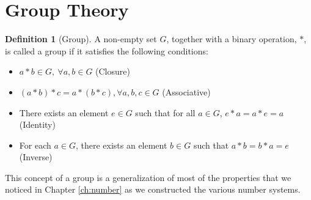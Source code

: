 \documentclass[
]{book}
\theoremstyle{definition}
\newtheorem{definition}{Definition}[chapter]
\theoremstyle{definition}
\theoremstyle{definition}
\theoremstyle{remark}
\begin{document}
\hypertarget{sec:groups}{%
\section{Group Theory}\label{sec:groups}}

\begin{definition}[Group]
\protect\hypertarget{def:unnamed-chunk-151}{}{\label{def:unnamed-chunk-151} {} }A non-empty set \(G\), together with a binary operation, \(*\), is called a group if it satisfies the following conditions:

\begin{itemize}
\item
  \(a*b \in G, \: \forall a,b \in G\) (Closure)
\item
  \((a*b)*c = a * (b*c), \forall a,b,c \in G\) (Associative)
\item
  There exists an element \(e \in G\) such that for all \(a\in G\), \(e*a=a*e=a\) (Identity)
\item
  For each \(a\in G\), there exists an element \(b\in G\) such that \(a*b=b*a=e\) (Inverse)
\end{itemize}
\end{definition}

This concept of a group is a generalization of most of the properties that we noticed in Chapter \ref{ch:number} as we constructed the various number systems.
\end{document}
